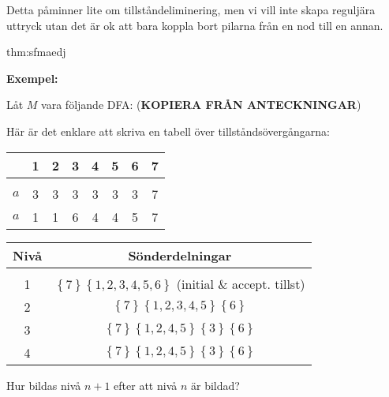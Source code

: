 \begin{figure}[ht!]
    \centering
    \caption{}
\end{figure}\par
\noindent Detta påminner lite om tillståndeliminering, men vi vill inte skapa reguljära uttryck utan det är ok att bara koppla bort pilarna från en nod till en annan.
\par\bigskip
\begin{theo}{thm:sfmaedj}
\end{theo}
\par\bigskip
\noindent\textbf{Exempel:}\par
\noindent Låt $M$ vara följande DFA: (\textbf{KOPIERA FRÅN ANTECKNINGAR})
\par\bigskip
\noindent Här är det enklare att skriva en tabell över tillståndsövergångarna:
\par\bigskip
\begin{center}
  \begin{tabular}{c|c|c|c|c|c|c|c}
    &1&2&3&4&5&6&7\\
    \hline\\
    $a$&3&3&3&3&3&3&7\\
    $a$&1&1&6&4&4&5&7
  \end{tabular}
\end{center}
\par\bigskip
\begin{center}
  \begin{tabular}{c|c}
    Nivå&Sönderdelningar\\
    \hline\\
    1&$\left\{7\right\}\left\{1,2,3,4,5,6\right\}$ (initial \& accept. tillst)\\
    2&$\left\{7\right\}\left\{1,2,3,4,5\right\}\left\{6\right\}$\\
    3&$\left\{7\right\}\left\{1,2,4,5\right\}\left\{3\right\}\left\{6\right\}$\\
    4&$\left\{7\right\}\left\{1,2,4,5\right\}\left\{3\right\}\left\{6\right\}$
  \end{tabular}
\end{center}
\par\bigskip
\noindent Hur bildas nivå $n+1$ efter att nivå $n$ är bildad?\par
